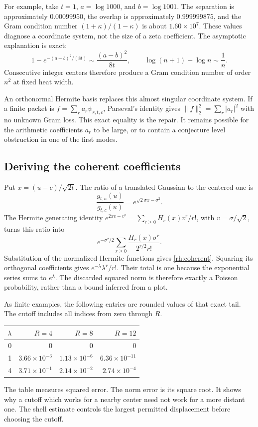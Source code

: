 For example, take \(t=1\), \(a=\log1000\), and \(b=\log1001\). The separation is approximately \(0.00099950\), the overlap is approximately \(0.999999875\), and the Gram condition number \((1+\kappa)/(1-\kappa)\) is about \(1.60\times10^7\). These values diagnose a coordinate system, not the size of a zeta coefficient. The asymptotic explanation is exact:
\[
1-e^{-(a-b)^2/(8t)}\sim\frac{(a-b)^2}{8t},
\qquad \log(n+1)-\log n\sim\frac1n.
\]
Consecutive integer centers therefore produce a Gram condition number of order \(n^2\) at fixed heat width.

An orthonormal Hermite basis replaces this almost singular coordinate system. If a finite packet is \(f=\sum_r a_r\psi_{r,t,c}\), Parseval's identity gives \(\|f\|_2^2=\sum_r|a_r|^2\) with no unknown Gram loss. This exact equality is the repair. It remains possible for the arithmetic coefficients \(a_r\) to be large, or to contain a conjecture level obstruction in one of the first modes.

\subsection{Deriving the coherent coefficients}

Put \(x=(u-c)/\sqrt{2t}\). The ratio of a translated Gaussian to the centered one is
\[
\frac{g_{t,a}(u)}{g_{t,c}(u)}
=e^{\sqrt2\sigma x-\sigma^2}.
\]
The Hermite generating identity
\(e^{2xv-v^2}=\sum_{r\ge0}H_r(x)v^r/r!\), with
\(v=\sigma/\sqrt2\), turns this ratio into
\[
e^{-\sigma^2/2}\sum_{r\ge0}
\frac{H_r(x)\sigma^r}{2^{r/2}r!}.
\]
Substitution of the normalized Hermite functions gives \eqref{rh:coherent}. Squaring its orthogonal coefficients gives
\(e^{-\lambda}\lambda^r/r!\). Their total is one because the exponential series sums to \(e^\lambda\). The discarded squared norm is therefore exactly a Poisson probability, rather than a bound inferred from a plot.

As finite examples, the following entries are rounded values of that exact tail. The cutoff includes all indices from zero through \(R\).
\begin{center}
\begin{tabular}{rrrr}
\toprule
\(\lambda\)&\(R=4\)&\(R=8\)&\(R=12\)\\
\midrule
0&0&0&0\\
1&\(3.66\times10^{-3}\)&\(1.13\times10^{-6}\)&\(6.36\times10^{-11}\)\\
4&\(3.71\times10^{-1}\)&\(2.14\times10^{-2}\)&\(2.74\times10^{-4}\)\\
\bottomrule
\end{tabular}
\end{center}
The table measures squared error. The norm error is its square root. It shows why a cutoff which works for a nearby center need not work for a more distant one. The shell estimate controls the largest permitted displacement before choosing the cutoff.

